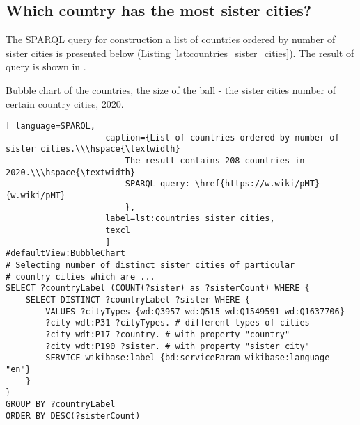 \subsection{Which country has the most sister cities?}

The SPARQL query for construction a list of countries ordered by number of sister cities is presented below (Listing \ref{lst:countries_sister_cities}). The result of query is shown in .

\begin{marginfigure}[2cm]
{
\setlength{\fboxsep}{0pt}%
\setlength{\fboxrule}{1pt}%
}
	\caption[Bubble chart of the countries by the sister cities number of cities, 2020.]{Bubble chart of the countries, the size of the ball - the sister cities number of certain country cities, 2020.}
\end{marginfigure}

\begin{lstlisting}[ language=SPARQL, 
                    caption={List of countries ordered by number of sister cities.\\\hspace{\textwidth}
                        The result contains 208 countries in 2020.\\\hspace{\textwidth}
                        SPARQL query: \href{https://w.wiki/pMT}{w.wiki/pMT}
                        },
                    label=lst:countries_sister_cities,
                    texcl 
                    ]
#defaultView:BubbleChart
# Selecting number of distinct sister cities of particular  
# country cities which are ... 
SELECT ?countryLabel (COUNT(?sister) as ?sisterCount) WHERE { 
	SELECT DISTINCT ?countryLabel ?sister WHERE {
		VALUES ?cityTypes {wd:Q3957 wd:Q515 wd:Q1549591 wd:Q1637706}
		?city wdt:P31 ?cityTypes. # different types of cities
		?city wdt:P17 ?country. # with property "country"
		?city wdt:P190 ?sister. # with property "sister city"
		SERVICE wikibase:label {bd:serviceParam wikibase:language "en"}
	}                                 
}
GROUP BY ?countryLabel
ORDER BY DESC(?sisterCount)
\end{lstlisting}%

